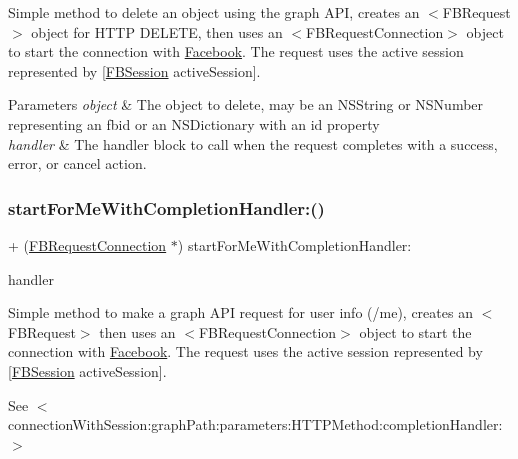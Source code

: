 Simple method to delete an object using the graph A\+PI, creates an $<$\+F\+B\+Request$>$ object for H\+T\+TP D\+E\+L\+E\+TE, then uses an $<$\+F\+B\+Request\+Connection$>$ object to start the connection with \hyperlink{interfaceFacebook}{Facebook}. The request uses the active session represented by {\ttfamily \mbox{[}\hyperlink{interfaceFBSession}{F\+B\+Session} active\+Session\mbox{]}}.


\begin{DoxyParams}{Parameters}
{\em object} & The object to delete, may be an N\+S\+String or N\+S\+Number representing an fbid or an N\+S\+Dictionary with an id property \\
\hline
{\em handler} & The handler block to call when the request completes with a success, error, or cancel action. \\
\hline
\end{DoxyParams}
\mbox{\label{interfaceFBRequestConnection_a9d89090f947eacfdf441172f842f5bc8}} 
\subsubsection{\texorpdfstring{start\+For\+Me\+With\+Completion\+Handler\+:()}{startForMeWithCompletionHandler:()}\hspace{0.1cm}{\footnotesize\ttfamily [1/5]}}
{\footnotesize\ttfamily + (\hyperlink{interfaceFBRequestConnection}{F\+B\+Request\+Connection} $\ast$) start\+For\+Me\+With\+Completion\+Handler\+: \begin{DoxyParamCaption}\item[{(F\+B\+Request\+Handler)}]{handler }\end{DoxyParamCaption}}

Simple method to make a graph A\+PI request for user info (/me), creates an $<$\+F\+B\+Request$>$ then uses an $<$\+F\+B\+Request\+Connection$>$ object to start the connection with \hyperlink{interfaceFacebook}{Facebook}. The request uses the active session represented by {\ttfamily \mbox{[}\hyperlink{interfaceFBSession}{F\+B\+Session} active\+Session\mbox{]}}.

See $<$connection\+With\+Session\+:graph\+Path\+:parameters\+:\+H\+T\+T\+P\+Method\+:completion\+Handler\+:$>$


